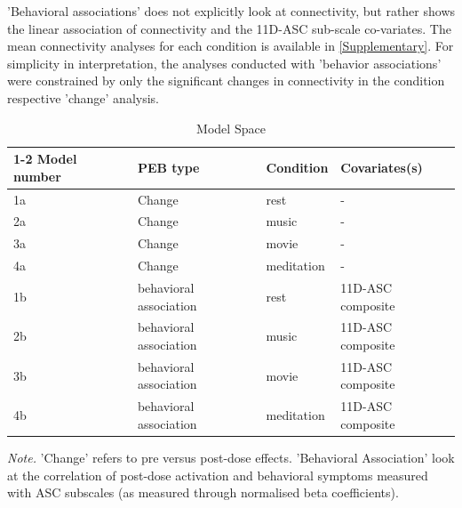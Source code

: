 \documentclass{article}
\begin{document}
'Behavioral associations' does not explicitly look at connectivity, but rather shows the linear association of connectivity and the 11D-ASC sub-scale co-variates. The mean connectivity analyses for each condition is available in \ref{Supplementary}. For simplicity in interpretation, the analyses conducted with 'behavior associations' were constrained by only the significant changes in connectivity in the condition respective 'change' analysis. 


\begin{table}
	\caption{Model Space}
	\centering
	\begin{tabular}{llll}
		\toprule
		\cmidrule(r){1-2}
		Model number     & PEB type     & Condition & Covariates(s) \\
		\midrule
		1a     & Change  &  rest & -   \\
		2a     & Change  &  music  & -   \\
		3a     & Change       &  movie & - \\
		4a     & Change       &  meditation & - \\        %
        1b &   behavioral association & rest & 11D-ASC composite \\
        2b & behavioral association & music & 11D-ASC composite \\
        3b    &   behavioral association & movie & 11D-ASC composite \\
        4b    &   behavioral association & meditation & 11D-ASC composite \\
        
		\bottomrule
	\end{tabular}
	\label{tab:table}

    \vspace{0.5em} %
    {\footnotesize \textit{Note.} 'Change' refers to pre versus post-dose effects. 'Behavioral Association' look at the correlation of post-dose activation and behavioral symptoms measured with ASC subscales (as measured through normalised beta coefficients).}

\end{table}
\end{document}

